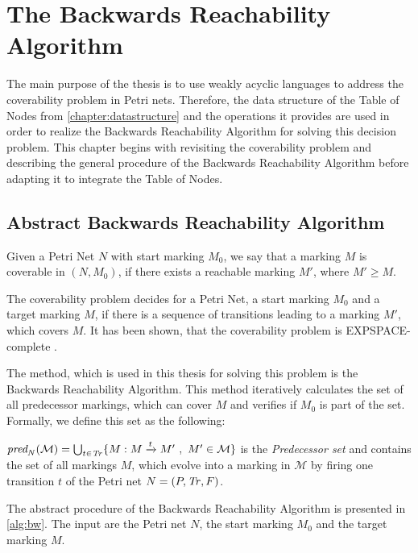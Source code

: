 \chapter{The Backwards Reachability Algorithm}\label{chapter:coverability}

The main purpose of the thesis is to use weakly acyclic languages to address the coverability problem in Petri nets. Therefore, the data structure of the Table of Nodes from \autoref{chapter:datastructure} and the operations it provides are used in order to realize the Backwards Reachability Algorithm for solving this decision problem. This chapter begins with revisiting the coverability problem and describing the general procedure of the Backwards Reachability Algorithm before adapting it to integrate the  Table of Nodes.

\section{Abstract Backwards Reachability Algorithm}\label{sec:abstractbw} 
Given a Petri Net $N$ with start marking $M_{0}$, we say that a marking $M$ is coverable in $(N,M_{0})$, if there exists a reachable marking $M'$, where $M'\ge M$. 

The coverability problem decides for a Petri Net, a start marking $M_{0}$ and a target marking $M$, if there is a sequence of transitions leading to a marking $M'$, which covers $M$. It has been shown, that the coverability problem is EXPSPACE-complete \cite{lipton_76,rackoff_78}. 


\par
The method, which is used in this thesis for solving this problem is the Backwards Reachability Algorithm. This method iteratively calculates the set of all predecessor markings, which can cover $M$ and verifies if $M_{0}$ is part of the set. Formally, we define this set as the following:
\begin{definition}\label{def:ppre}
$\operatorname{\textit{pred}}_{N}(\mathcal{M}) = \bigcup_{t \in \mathit{Tr}} \{M : M \xrightarrow{t} M' \ , \ M' \in \mathcal{M} \}$ is the \emph{Predecessor set} and contains the set of all markings $M$, which evolve into a marking in $\mathcal{M}$ by firing one transition $t$ of the Petri net $N = (P,\mathit{Tr},F)$.
\end{definition}
\par 
The abstract procedure of the Backwards Reachability Algorithm is presented in \autoref{alg:bw}. The input are the Petri net $N$, the start marking $M_{0}$ and the target marking $M$. 

